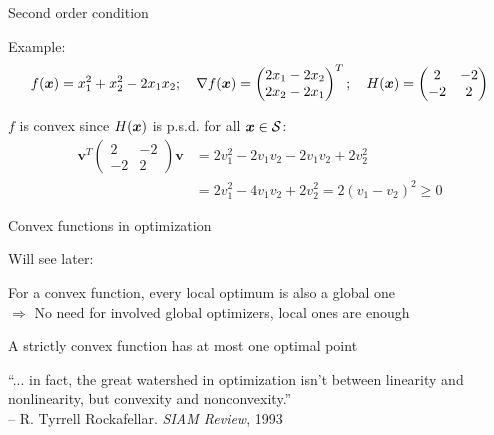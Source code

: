 \documentclass[11pt,compress,t,notes=noshow, xcolor=table]{beamer}
\begin{document}
\begin{framei}{Second order condition}
\item Example:
$$f(\bm{x}) = x_1^2 + x_2^2 - 2x_1x_2; \quad 
\nabla f(\bm{x}) = \begin{pmatrix}2x_1 - 2x_2 \\ 2x_2 - 2x_1\end{pmatrix}^T; \quad 
H(\bm{x}) = \begin{pmatrix} 2 & -2 \\ -2 & 2 \end{pmatrix}$$
\item $f$ is convex since $H(\bm{x})$ is p.s.d. for all $\bm{x}\in\mathcal{S}$:
\begin{align*}
\mathbf{v}^T\begin{pmatrix} 2 & -2 \\ -2 & 2 \end{pmatrix}\mathbf{v} &= 2v_1^2 - 2v_1v_2 -2v_1v_2 + 2v_2^2 \\
&= 2v_1^2 - 4v_1v_2 + 2v_2^2 = 2 (v_1 - v_2)^2 \ge 0
\end{align*}
\end{framei}


\begin{framei}{Convex functions in optimization}
\item Will see later:  
\item For a convex function, every local optimum is also a global one \\
$\Rightarrow$ No need for involved global optimizers, local ones are enough
\item A strictly convex function has at most one optimal point

\item \enquote{... in fact, the great watershed in optimization isn't between linearity and nonlinearity, but convexity and nonconvexity.}\\
-- R. Tyrrell Rockafellar. \textit{SIAM Review}, 1993
\end{framei}

\endlecture
\end{document}
